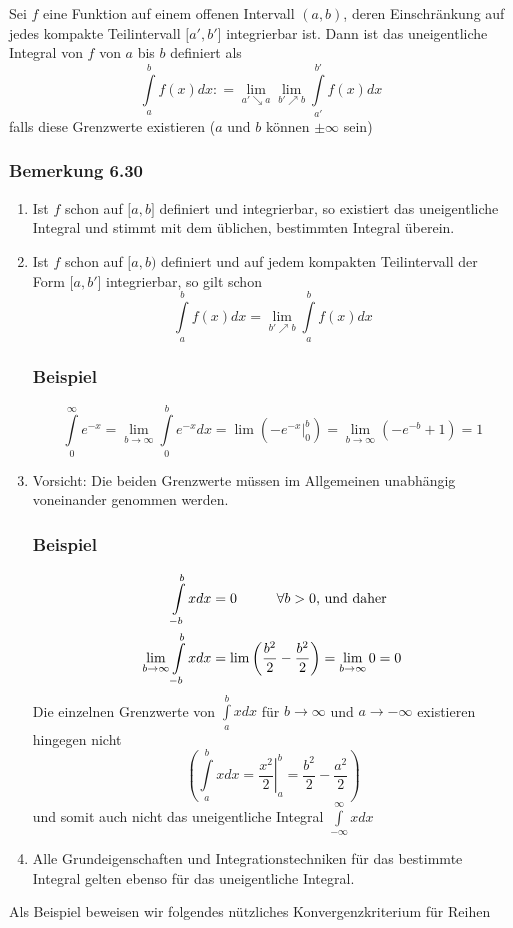 \begin{definition}{6.29}
Sei $f$ eine Funktion auf einem offenen Intervall $(a,b)$, deren Einschränkung auf jedes kompakte Teilintervall $\lbrack a',b'\rbrack$ integrierbar ist. Dann ist das uneigentliche Integral von $f$ von $a$ bis $b$ definiert als \[\int\limits_a^b {f(x)dx: = \mathop {\lim }\limits_{a' \searrow a} \mathop {\lim }\limits_{b' \nearrow b} } \int\limits_{a'}^{b'} {f(x)dx} \] falls diese Grenzwerte existieren ($a$ und $b$ können $\pm \infty$ sein)
\end{definition}

 \subsubsection*{Bemerkung 6.30}
\begin{enumerate}
\item Ist $f$ schon auf $\lbrack a,b\rbrack$ definiert und integrierbar, so existiert das uneigentliche Integral und stimmt mit dem üblichen, bestimmten Integral überein.
\item Ist $f$ schon auf $\lbrack a,b)$ definiert und auf jedem kompakten Teilintervall der Form $\lbrack a,b'\rbrack$ integrierbar, so gilt schon  \[\int\limits_a^b {f(x)dx = \mathop {\lim }\limits_{b' \nearrow b} } \int\limits_a^b {f(x)dx} \]
\subsubsection*{Beispiel}
\[\int\limits_0^\infty  {{e^{ - x}}}  = \mathop {\lim }\limits_{b \to \infty } \int\limits_{{0}}^b {{e^{ - x}}dx}  = \lim \left( {\left. { - {e^{ - x}}} \right|_{{0}}^b} \right) = \mathop {\lim }\limits_{b \to \infty } \left( { - {e^{ - b}} + 1} \right) = 1\]
\item Vorsicht: Die beiden Grenzwerte müssen im Allgemeinen unabhängig voneinander genommen werden.
\subsubsection*{Beispiel}

\begin{align*}
\int\limits_{ - b}^b xdx &= 0 \text{\hspace{10mm}}\forall b>0\text{, und daher}\\
\mathop {\lim }\limits_{b \to \infty } \int\limits_{ - b}^b xdx &=\lim \left( {\frac{{{b^2}}}{2} - \frac{{{b^2}}}{2}} \right) = \mathop {\lim }\limits_{b \to \infty } 0 = 0
\end{align*}
Die einzelnen Grenzwerte von $\int\limits_a^b {xdx} $ für $b\rightarrow \infty$ und $a\rightarrow -\infty$ existieren hingegen nicht \[\left( {\int\limits_a^b {xdx = \left. {\frac{{{x^2}}}{2}} \right|_a^b = \frac{{{b^2}}}{2} - \frac{{{a^2}}}{2}} } \right)\] und somit auch nicht das uneigentliche Integral $\int\limits_{ - \infty }^\infty  {xdx} $

\item Alle Grundeigenschaften und Integrationstechniken für das bestimmte Integral gelten ebenso für das uneigentliche Integral.
\end{enumerate}
Als Beispiel beweisen wir folgendes nützliches Konvergenzkriterium für Reihen
